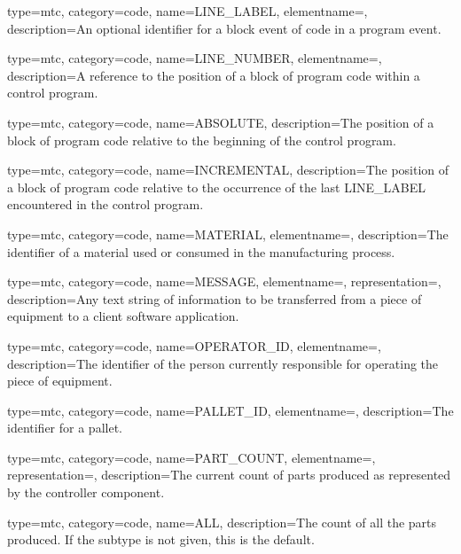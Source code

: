 {
  type=mtc,
  category=code,
  name={LINE\_LABEL},
  elementname=,
  description={An optional identifier for a \gls{block event} of code in a \gls{program event}.}
}

{
  type=mtc,
  category=code,
  name={LINE\_NUMBER},
  elementname=,
  description={A reference to the position of a block of program code within a control program.}
}

{
  type=mtc,
  category=code,
  name={ABSOLUTE},
  description={The position of a block of program code relative to the beginning of the control program.}
}

{
  type=mtc,
  category=code,
  name={INCREMENTAL},
  description={The position of a block of program code relative to the occurrence of the last LINE\_LABEL encountered in the control program.}
}

{
  type=mtc,
  category=code,
  name={MATERIAL},
  elementname=,
  description={The identifier of a material used or consumed in the manufacturing process.}
}

{
  type=mtc,
  category=code,
  name={MESSAGE},
  elementname=,
  representation=,
  description={Any text string of information to be transferred from a piece of equipment to a client software application.}
}

{
  type=mtc,
  category=code,
  name={OPERATOR\_ID},
  elementname=,
  description={The identifier of the person currently responsible for operating the piece of equipment.}
}

{
  type=mtc,
  category=code,
  name={PALLET\_ID},
  elementname=,
  description={The identifier for a pallet.}
}

{
  type=mtc,
  category=code,
  name={PART\_COUNT},
  elementname=,
  representation=,
  description={The current count of parts produced as represented by the \gls{controller} component.}
}

{
  type=mtc,
  category=code,
  name={ALL},
  description={The count of all the parts produced.  If the subtype is not given, this is the default.}
}

